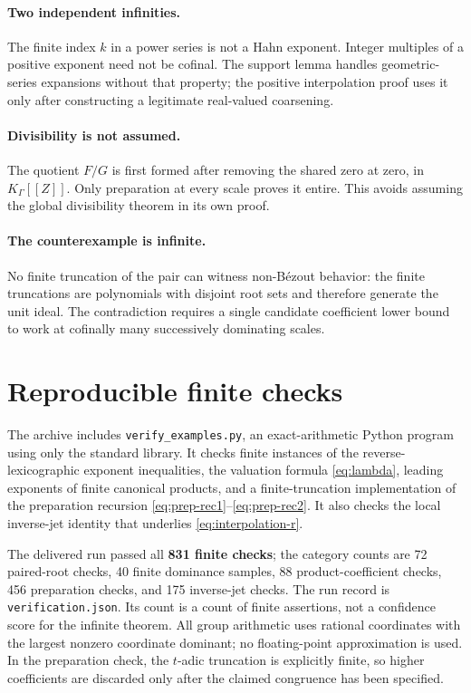 \documentclass[11pt]{article}
\theoremstyle{plain}
\theoremstyle{plain}
\theoremstyle{plain}
\theoremstyle{definition}
\theoremstyle{definition}
\theoremstyle{definition}
\theoremstyle{remark}
\newcommand{\K}{K_\Gamma}\newcommand{\E}{\mathcal E_\Gamma}
\begin{document}
\paragraph{Two independent infinities.}
The finite index $k$ in a power series is not a Hahn exponent. Integer
multiples of a positive exponent need not be cofinal. The support
lemma handles geometric-series expansions without that property;
the positive interpolation proof uses it only after constructing a
legitimate real-valued coarsening.

\paragraph{Divisibility is not assumed.}
The quotient $F/G$ is first formed after removing the shared zero at
zero, in $\K[[Z]]$. Only preparation at every scale proves it entire.
This avoids assuming the global divisibility theorem in its own proof.

\paragraph{The counterexample is infinite.}
No finite truncation of the pair can witness non-B\'ezout behavior:
the finite truncations are polynomials with disjoint root sets and
therefore generate the unit ideal. The contradiction requires a
single candidate coefficient lower bound to work at cofinally many
successively dominating scales.

\section{Reproducible finite checks}
\label{app:checks}

The archive includes \texttt{verify\_examples.py}, an exact-arithmetic
Python program using only the standard library. It checks finite
instances of the reverse-lexicographic exponent inequalities, the
valuation formula \eqref{eq:lambda}, leading exponents of finite
canonical products, and a finite-truncation implementation of the
preparation recursion \eqref{eq:prep-rec1}--\eqref{eq:prep-rec2}.
It also checks the local inverse-jet identity that underlies
\eqref{eq:interpolation-r}.

The delivered run passed all \textbf{831 finite checks}; the category counts are
72 paired-root checks, 40 finite dominance samples, 88 product-coefficient
checks, 456 preparation checks, and 175 inverse-jet checks.
The run record is \texttt{verification.json}. Its count is a count of
finite assertions, not a confidence score for the infinite theorem.
All group arithmetic uses rational coordinates with the largest
nonzero coordinate dominant; no floating-point approximation is
used. In the preparation check, the $t$-adic truncation is explicitly
finite, so higher coefficients are discarded only after the claimed
congruence has been specified.
\end{document}
